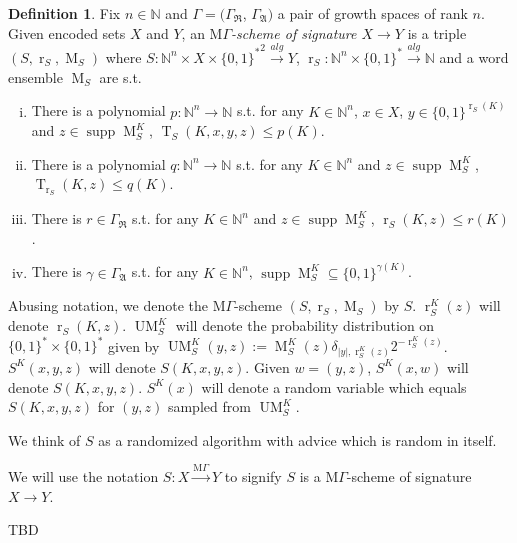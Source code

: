 \documentclass{article}
\theoremstyle{definition}
\newtheorem{definition}{Definition}[section]
\theoremstyle{plain}
\newcommand{\Words}{{\{ 0, 1 \}^*}}
\newcommand{\WordsLen}[1]{{\{ 0, 1 \}^{#1}}}
\DeclareMathOperator{\Supp}{supp}
\DeclareMathOperator{\T}{T}
\DeclareMathOperator{\R}{r}
\DeclareMathOperator{\M}{M}
\DeclareMathOperator{\UM}{UM}
\newcommand{\Nats}{\mathbb{N}}
\newcommand{\Abs}[1]{\lvert #1 \rvert}
\begin{document}
\begin{definition}

Fix $n \in \Nats$ and $\Gamma=(\Gamma_{\mathfrak{R}}$, $\Gamma_{\mathfrak{A}})$ a pair of growth spaces of rank $n$. Given encoded sets $X$ and $Y$, an \emph{$\mathrm{M}\Gamma$-scheme of signature $X \rightarrow Y$} is a triple $(S,\R_S,\M_S)$ where $S: \Nats^n \times X \times \Words^2 \xrightarrow{alg} Y$, $\R_S: \Nats^n \times \Words \xrightarrow{alg} \Nats$ and a word ensemble $\M_S$ are s.t.

\begin{enumerate}[(i)]

\item There is a polynomial $p: \Nats^n \rightarrow \Nats$ s.t. for any $K \in \Nats^n$, $x \in X$, ${y \in \WordsLen{\R_S(K)}}$ and $z \in \Supp \M_S^K$, $\T_S(K,x,y,z) \leq p(K)$.

\item There is a polynomial $q: \Nats^n \rightarrow \Nats$ s.t. for any $K \in \Nats^n$ and $z \in \Supp \M_S^K$, ${\T_{\R_S}(K,z) \leq q(K)}$.

\item There is $r \in \Gamma_{\mathfrak{R}}$ s.t. for any $K \in \Nats^n$ and $z \in \Supp \M_S^K$, $\R_S(K,z) \leq r(K)$.

\item There is $\gamma \in \Gamma_{\mathfrak{A}}$ s.t. for any $K \in \Nats^n$, $\Supp \M_S^K \subseteq \WordsLen{\gamma(K)}$.

\end{enumerate}

Abusing notation, we denote the $\mathrm{M}\Gamma$-scheme $(S,\R_S,\M_S)$ by $S$. $\R_S^K(z)$ will denote $\R_S(K,z)$. $\UM_S^K$ will denote the probability distribution on ${\Words \times \Words}$ given by $\UM_S^K(y,z):= \M_S^K(z) \delta_{\Abs{y},\R_S^K(z)} 2^{-\R_S^K(z)}$. $S^K(x,y,z)$ will denote $S(K,x,y,z)$. Given $w=(y,z)$, $S^K(x,w)$ will denote $S(K,x,y,z)$. $S^K(x)$ will denote a random variable which equals $S(K,x,y,z)$ for $(y,z)$ sampled from $\UM_S^K$. 

We think of $S$ as a randomized algorithm with advice which is random in itself.

We will use the notation $S: X \xrightarrow{\mathrm{M}\Gamma} Y$ to signify $S$ is a $\mathrm{M}\Gamma$-scheme of signature $X \rightarrow Y$.

\end{definition}

TBD
\end{document}
